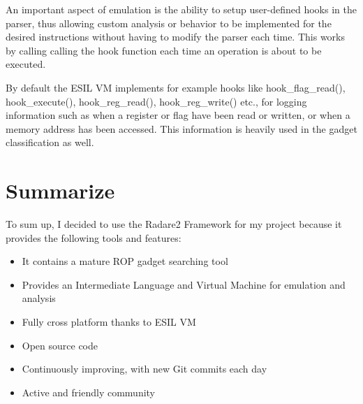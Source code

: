 An important aspect of emulation is the ability to setup user-defined hooks in the parser, thus allowing custom analysis or behavior to be implemented for the desired instructions without having to modify the parser each time. This works by calling calling the hook function each time an operation is about to be executed.

By default the ESIL VM implements for example hooks like hook_flag_read(), hook_execute(), hook_reg_read(), hook_reg_write() etc., for logging information such as when a register or flag have been read or written, or when a memory address has been accessed. This information is heavily used in the gadget classification as well.


\section{Summarize}
\label{sec:sumup}

To sum up, I decided to use the Radare2 Framework for my project because it provides the following tools and features:
\begin{itemize}
	\item It contains a mature ROP gadget searching tool
	\item Provides an Intermediate Language and Virtual Machine for emulation and analysis
	\item Fully cross platform thanks to ESIL VM
	\item Open source code
	\item Continuously improving, with new Git commits each day
	\item Active and friendly community
\end{itemize}



